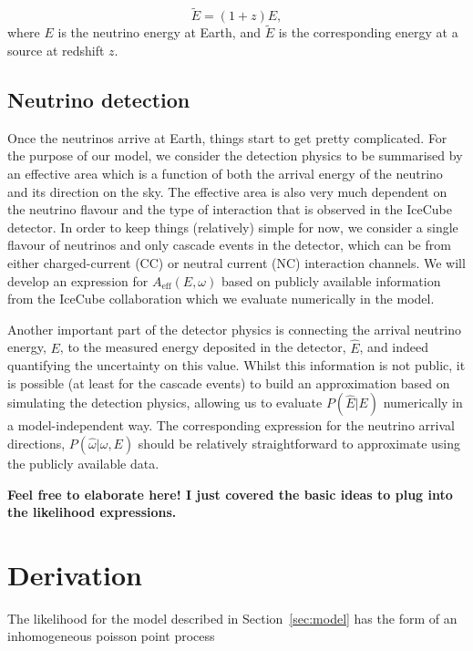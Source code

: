 \documentclass[fontsize=12pt]{article}
\begin{document}
\begin{equation}
\tilde{E} = (1+z)E,
\end{equation}
where $E$ is the neutrino energy at Earth, and $\tilde{E}$ is the corresponding energy at a source at redshift $z$.  

\subsection{Neutrino detection}

Once the neutrinos arrive at Earth, things start to get pretty complicated. For the purpose of our model, we consider the detection physics to be summarised by an effective area which is a function of both the arrival energy of the neutrino and its direction on the sky. The effective area is also very much dependent on the neutrino flavour and the type of interaction that is observed in the IceCube detector. In order to keep things (relatively) simple for now, we consider a single flavour of neutrinos and only cascade events in the detector, which can be from either charged-current (CC) or neutral current (NC) interaction channels. We will develop an expression for $A_\mathrm{eff}(E, \omega)$ based on publicly available information from the IceCube collaboration which we evaluate numerically in the model. 

Another important part of the detector physics is connecting the arrival neutrino energy, $E$, to the measured energy deposited in the detector, $\hat{E}$, and indeed quantifying the uncertainty on this value. Whilst this information is not public, it is possible (at least for the cascade events) to build an approximation based on simulating the detection physics, allowing us to evaluate $P(\hat{E} | E)$ numerically in a model-independent way. The corresponding expression for the neutrino arrival directions, $P(\hat{\omega} | \omega, E)$ should be relatively straightforward to approximate using the publicly available data.

\textbf{Feel free to elaborate here! I just covered the basic ideas to plug into the likelihood expressions.}
 
\section{Derivation}

The likelihood for the model described in Section~\ref{sec:model} has the form of an inhomogeneous poisson point process
\end{document}
